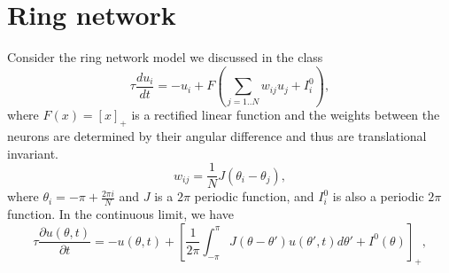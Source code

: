 \documentclass{article}
\begin{document}
\section*{Ring network}
Consider the ring network model we discussed in the class
\begin{equation}
\tau \frac{du_i}{dt} = -u_i + F\left(\sum_{j=1..N} w_{ij}u_j+ I_i^0\right), \label{ring equation}
\end{equation}
where $F(x) = [x]_+$ is a rectified linear function and the weights between the neurons are determined by their angular difference and thus are translational invariant. 
\begin{equation}
w_{ij} = \frac{1}{N} J(\theta_i - \theta_j),
\end{equation}
where $\theta_i = -\pi+ \frac{2\pi i}{N}$ and $J$ is a $2\pi$ periodic function, and  $I_i^0$ is also a periodic $2\pi$ function. In the continuous limit, we have 
\begin{equation}
\tau \frac{\partial u(\theta, t)}{\partial t} = -u(\theta, t) + \left[\frac{1}{2\pi}\int_{-\pi}^{\pi} J(\theta - \theta') u(\theta', t) d\theta' + I^0 (\theta)\right]_+,
\end{equation}
\end{document}
